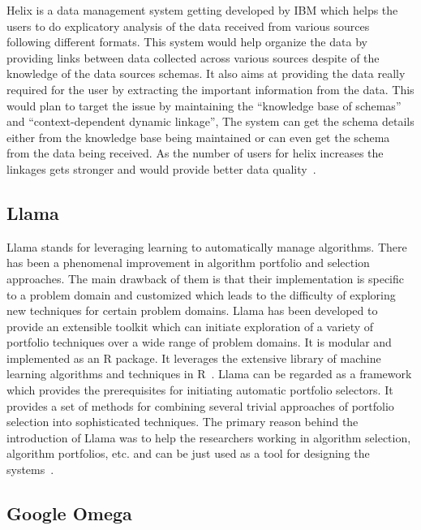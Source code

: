 {Helix is a data management system getting developed by IBM which helps
the users to do explicatory analysis of the data received from various
sources following different formats. This system would help organize
the data by providing links between data collected across various
sources despite of the knowledge of the data sources schemas. It also
aims at providing the data really required for the user by extracting
the important information from the data. This would plan to target the
issue by maintaining the ``knowledge base of schemas'' and
``context-dependent dynamic linkage'', The system can get the schema
details either from the knowledge base being maintained or can even
get the schema from the data being received. As the number of users
for helix increases the linkages gets stronger and would provide
better data quality~\cite{www-ibm-helix-paper}.

     \pv
      
\subsection{Llama}

Llama stands for leveraging learning to automatically manage
algorithms. There has been a phenomenal improvement in algorithm
portfolio and selection approaches. The main drawback of them is that
their implementation is specific to a problem domain and customized
which leads to the difficulty of exploring new techniques for certain
problem domains. Llama has been developed to provide an extensible
toolkit which can initiate exploration of a variety of portfolio
techniques over a wide range of problem domains. It is modular and
implemented as an R package. It leverages the extensive library of
machine learning algorithms and techniques in R~\cite{lla1}. Llama can
be regarded as a framework which provides the prerequisites for
initiating automatic portfolio selectors. It provides a set of methods
for combining several trivial approaches of portfolio selection into
sophisticated techniques. The primary reason behind the introduction
of Llama was to help the researchers working in algorithm selection,
algorithm portfolios, etc. and can be just used as a tool for
designing the systems~\cite{lla1}.
     
\subsection{Google Omega}

\pv 

}
